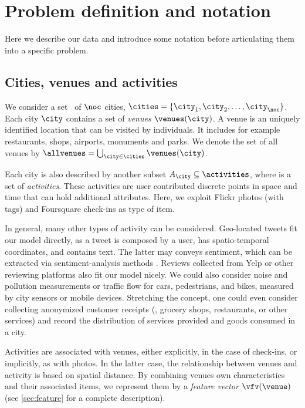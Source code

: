 \chapter{Problem definition and notation}
\label{ch:problem}

Here we describe our data and introduce some notation before articulating them
into a specific problem.

\section{Cities, venues and activities}
We consider a set \cities\ of $\noc$ cities, 
$\cities=\{\city_1, \city_2, \ldots,\city_\noc\}$.
Each city $\city$ contains a set of \emph{venues} $\venues(\city)$.
A venue is an uniquely identified location that can be visited by individuals.
It includes for example restaurants, shops, airports, monuments and parks.
We denote the set of all venues by $\allvenues = \bigcup_{\city\in\cities} \venues(\city)$.

Each city \city{} is also described by another subset $A_\city \subseteq
\activities$, where \activities{} is a set of \emph{activities}.  These
activities are user contributed discrete points in space and time that can hold
additional attributes. Here, we exploit Flickr photos (with tags) and
Foursquare check-ins as type of item.

In general, many other types of activity can be considered.  Geo-located tweets
fit our model directly, as a tweet is composed by a user, has spatio-temporal
coordinates, and contains text. The latter may conveys sentiment, which can be
extracted via sentiment-analysis methods \autocite{SentimentAnalysis08}.
Reviews collected from Yelp or other reviewing platforms also fit our model
nicely.  We could also consider noise and pollution measurements or traffic
flow for cars, pedestrians, and bikes, measured by city sensors or mobile
devices.  Stretching the concept, one could even consider collecting anonymized
customer receipts (\eg{}, grocery shops, restaurants, or other services) and
record the distribution of services provided and goods consumed in a city.

Activities are associated with venues, either explicitly, in the case of
check-ins, or implicitly, as with photos. In the latter case, the relationship
between venues and activity is based on spatial distance.  By combining venues
own characteristics and their associated items, we represent them by a {\em
feature vector} $\vfv(\venue)$ (see \autoref{sec:feature}
 for a complete description).


